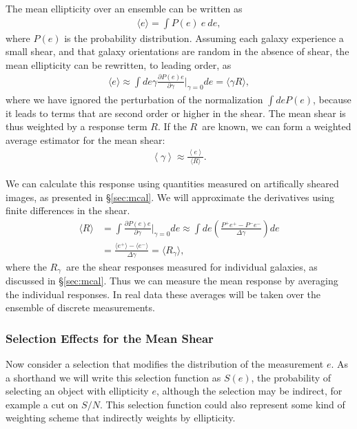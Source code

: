 \documentclass[a4paper,fleqn,usenatbib]{mnras}
\newcommand{\snr}{$S/N$}
\newcommand{\est}{$e$}
\newcommand{\mest}{e}
\newcommand{\mcalR}{$R$}
\newcommand{\mcalRmean}{$\langle R \rangle$}
\newcommand{\mcalRg}{$R_{\gamma}$}
\begin{document}
The mean ellipticity over an ensemble can be written as 
\begin{align}
    \langle \mest \rangle = \int P(\mest)~\mest~d\mest,
\end{align}
where $P(\mest)$ is the probability distribution.
Assuming each galaxy experience a small shear, and that galaxy orientations
are random in the absence of shear, the mean ellipticity can be rewritten, to
leading order, as
\begin{align} \label{eq:basicR}
    \langle e \rangle \approx \int de \gamma \frac{\partial P(\mest) \mest  }{\partial \gamma}\bigg|_{\gamma=0} d\mest = \langle \gamma R \rangle,
\end{align}
where we have ignored the perturbation of the normalization $\int de P(e)$,
because it leads to terms that are second order or higher in the shear.
The mean shear is thus weighted by a response term \mcalR.  If
the \mcalR\ are known, we can form a weighted average estimator
for the mean shear:
\begin{align}
    \left< \gamma \right> \approx \frac{\left< e \right>}{\mbox{\mcalRmean}}.
\end{align}

We can calculate this response using quantities measured on artifically sheared
images, as presented in \S \ref{sec:mcal}.  We will approximate the derivatives
using finite differences in the shear.
\begin{align} \label{eq:basicRfinite}
    \mbox{\mcalRmean}  &= \int \frac{\partial P(\mest) \mest  }{\partial \gamma}\bigg|_{\gamma=0} d\mest
    \approx \int d\mest \left( \frac{ P^+ \mest^+ - P^- \mest^- }{\Delta \gamma}\right)  d\mest   \nonumber \\
    &= \frac{\langle \mest^+ \rangle - \langle \mest^- \rangle}{\Delta \gamma}
	= \langle \mbox{\mcalRg} \rangle,
\end{align}
where the \mcalRg\ are the shear responses measured for individual galaxies,
as discussed in \S \ref{sec:mcal}.  Thus we can measure the mean response
by averaging the individual responses.  In real data these averages
will be taken over the ensemble of discrete measurements.

\subsubsection{Selection Effects for the Mean Shear}

Now consider a selection that modifies the distribution of the measurement
\est.
As a shorthand we will write this selection function as $S(\mest)$, the
probability of selecting an object with ellipticity \est, although the
selection may be indirect, for example a cut on \snr.  This selection function
could also represent some kind of weighting scheme that indirectly weights by
ellipticity.
\end{document}
